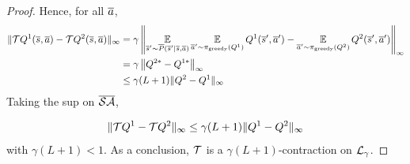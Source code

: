 \begin{proof}
Hence, for all $\overline{a}$,
\begin{align*}
    \|\mathcal{T} Q^1(\overline{s}, \overline{a}) - \mathcal{T} Q^2(\overline{s}, \overline{a})\|_\infty &= \gamma\left\|\operatorname*{\mathbb{E}}\limits_{\overline{s}'\sim\overline{P}(\overline{s}'|\overline{s},\overline{a})} \operatorname*{\mathbb{E}}\limits_{\overline{a}'\sim\pi_\text{greedy}(Q^1)}Q^1(\overline{s}',\overline{a}') - \operatorname*{\mathbb{E}}\limits_{\overline{a}'\sim\pi_\text{greedy}(Q^2)}Q^2(\overline{s}',\overline{a}')\right\|_\infty \\
    &= \gamma\left\|Q^{2*} - Q^{1*}\right\|_\infty \\
    &\leq \gamma(L+1)\|Q^2-Q^1\|_\infty
\end{align*}
Taking the sup on $\overline{\mathcal{S}}\overline{\mathcal{A}}$,

\begin{equation*}
    \|\mathcal{T} Q^1 - \mathcal{T} Q^2\|_\infty \leq \gamma(L+1)\|Q^1-Q^2\|_\infty
\end{equation*}
with $\gamma(L+1) < 1$.
As a conclusion, $\mathcal{T}$ is a $\gamma(L+1)$-contraction on $\mathcal{L}_\gamma$.
\end{proof}








